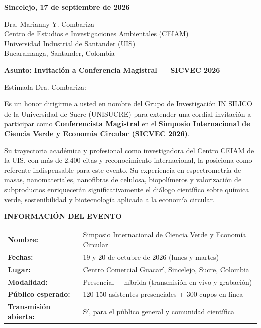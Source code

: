 \documentclass[12pt,a4paper]{article}
\begin{document}
\vspace{0.5cm}

\noindent
\textbf{Sincelejo, 17 de septiembre de 2026}

\vspace{0.8cm}

\noindent
Dra. Marianny Y. Combariza\\
Centro de Estudios e Investigaciones Ambientales (CEIAM)\\
Universidad Industrial de Santander (UIS)\\
Bucaramanga, Santander, Colombia

\vspace{0.8cm}

\noindent
\textbf{\large Asunto: Invitación a Conferencia Magistral — SICVEC 2026}

\vspace{0.8cm}

Estimada Dra. Combariza:

\vspace{0.8cm}

Es un honor dirigirme a usted en nombre del Grupo de Investigación IN SILICO de la Universidad de Sucre (UNISUCRE) para extender una cordial invitación a participar como \textbf{Conferencista Magistral} en el \textbf{Simposio Internacional de Ciencia Verde y Economía Circular (SICVEC 2026)}.

Su trayectoria académica y profesional como investigadora del Centro CEIAM de la UIS, con más de 2.400 citas y reconocimiento internacional, la posiciona como referente indispensable para este evento. Su experiencia en espectrometría de masas, nanomateriales, nanofibras de celulosa, biopolímeros y valorización de subproductos enriquecerán significativamente el diálogo científico sobre química verde, sostenibilidad y biotecnología aplicada a la economía circular.

\vspace{0.5cm}

\noindent
\textbf{INFORMACIÓN DEL EVENTO}

\begin{tabular}{ll}
\textbf{Nombre:} & Simposio Internacional de Ciencia Verde y Economía Circular \\
\textbf{Fechas:} & 19 y 20 de octubre de 2026 (lunes y martes) \\
\textbf{Lugar:} & Centro Comercial Guacarí, Sincelejo, Sucre, Colombia \\
\textbf{Modalidad:} & Presencial + híbrida (transmisión en vivo y grabación) \\
\textbf{Público esperado:} & 120-150 asistentes presenciales + 300 cupos en línea \\
\textbf{Transmisión abierta:} & Sí, para el público general y comunidad científica \\
\end{tabular}
\end{document}
